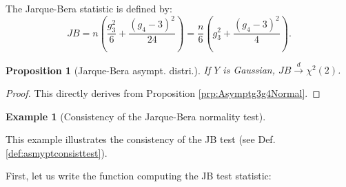 \documentclass[
  12pt,
]{book}
\newtheorem{proposition}{Proposition}[chapter]
\theoremstyle{definition}
\theoremstyle{definition}
\newtheorem{example}{Example}[chapter]
\theoremstyle{definition}
\theoremstyle{definition}
\theoremstyle{remark}
\begin{document}
The Jarque-Bera statistic is defined by:
\[
JB = n \left( \frac{g_3^2}{6}+\frac{(g_4-3)^2}{24} \right) = \frac{n}{6}\left(g_3^2 + \frac{(g_4-3)^2}{4}\right).
\]

\begin{proposition}[Jarque-Bera asympt. distri.]
\protect\hypertarget{prp:JB}{}\label{prp:JB}If \(Y\) is Gaussian, \(JB \overset{d}{\rightarrow} \chi^2(2)\).
\end{proposition}

\begin{proof}
This directly derives from Proposition \ref{prp:Asymptg3g4Normal}.
\end{proof}

\begin{example}[Consistency of the Jarque-Bera normality test]
\protect\hypertarget{exm:JB}{}\label{exm:JB}

This example illustrates the consistency of the JB test (see Def. \ref{def:asmyptconsisttest}).

First, let us write the function computing the JB test statistic:


\end{example}
\end{document}
